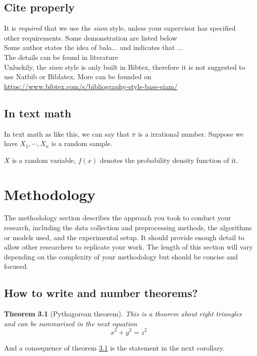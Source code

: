 \documentclass[openany]{book}
\numberwithin{figure}{chapter}
\numberwithin{equation}{chapter}
\newtheorem{theorem}{Theorem}[chapter]
\begin{document}
\section{Cite properly}

It is \emph{required} that we use the \emph{siam} style, unless your supervisor has specified other requirements.  Some demonstration are listed below\\

Some author states the idea of bala... and  indicates that ...\cite{bai2021statistical,cox1972regression}\\

The details can be found in literature \cite{sperr2001survival}\\

Unluckily, the \emph{siam} style is only built in Bibtex, therefore it is not suggested to use Natbib or Biblatex. More can be founded on  \href{https://www.bibtex.com/s/bibliography-style-base-siam/}{https://www.bibtex.com/s/bibliography-style-base-siam/}

\section{In text math}
In text math as like this, we can say that $\pi$ is a irrational number. Suppose we have $X_1,\cdots, X_n$ is a random sample.

$X$ is a random variable, $f(x)$ denotes the probability density function of it.

\chapter{Methodology}

The methodology section describes the approach you took to conduct your research, including the data collection and preprocessing methods, the algorithms or models used, and the experimental setup. It should provide enough detail to allow other researchers to replicate your work. The length of this section will vary depending on the complexity of your methodology but should be concise and focused.

\section{How to write and number theorems?}
\begin{theorem}[Pythagorean theorem]
\label{thm1}
This is a theorem about right triangles and can be summarised in the next 
equation 
$$ x^2 + y^2 = z^2 $$ 
\end{theorem}
And a consequence of theorem \ref{thm1} is the statement in the next 
corollary.
\end{document}
